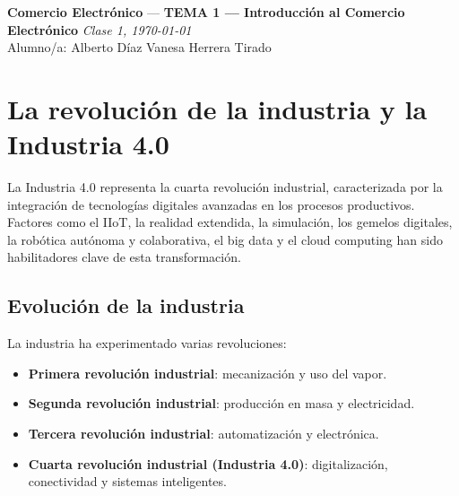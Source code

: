 \documentclass[11pt,a4paper]{article}
\newcommand{\asignatura}{Comercio Electrónico}
\newcommand{\tema}{TEMA 1 — Introducción al Comercio Electrónico}  %
\newcommand{\clase}{Clase 1}
\newcommand{\fecha}{\today}                              %
\begin{document}
		{\large \textbf{\asignatura} \;—\; \textbf{\tema} \hfill \textit{\clase, \fecha}}\\[0.4em]
		\faUser\; Alumno/a: Alberto Díaz\hfill
		\faChalkboardTeacher\; Vanesa Herrera Tirado\hfill

		\vspace{0.6em}

		\tableofcontents

		\section{La revolución de la industria y la Industria 4.0}

		\begin{ResumenBox}
		La Industria 4.0 representa la cuarta revolución industrial, caracterizada por la integración de tecnologías digitales avanzadas en los procesos productivos. Factores como el IIoT, la realidad extendida, la simulación, los gemelos digitales, la robótica autónoma y colaborativa, el big data y el cloud computing han sido habilitadores clave de esta transformación.
		\end{ResumenBox}

		\subsection{Evolución de la industria}
		La industria ha experimentado varias revoluciones:
		\begin{itemize}
			\item \textbf{Primera revolución industrial}: mecanización y uso del vapor.
			\item \textbf{Segunda revolución industrial}: producción en masa y electricidad.
			\item \textbf{Tercera revolución industrial}: automatización y electrónica.
			\item \textbf{Cuarta revolución industrial (Industria 4.0)}: digitalización, conectividad y sistemas inteligentes.
		\end{itemize}
\end{document}
